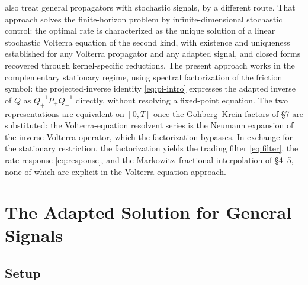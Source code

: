 \documentclass[11pt]{article}
\theoremstyle{plain}
\begin{document}
\citet{AbiJaberNeuman2025} also treat general propagators with stochastic signals, by a different route. That approach solves the finite-horizon problem by infinite-dimensional stochastic control: the optimal rate is characterized as the unique solution of a linear stochastic Volterra equation of the second kind, with existence and uniqueness established for any Volterra propagator and any adapted signal, and closed forms recovered through kernel-specific reductions. The present approach works in the complementary stationary regime, using spectral factorization of the friction symbol: the projected-inverse identity \eqref{eq:pi-intro} expresses the adapted inverse of $Q$ as $Q_+^{-1}P_+Q_-^{-1}$ directly, without resolving a fixed-point equation. The two representations are equivalent on $[0,T]$ once the Gohberg--Krein factors of \S7 are substituted: the Volterra-equation resolvent series is the Neumann expansion of the inverse Volterra operator, which the factorization bypasses. In exchange for the stationary restriction, the factorization yields the trading filter \eqref{eq:filter}, the rate response \eqref{eq:response}, and the Markowitz--fractional interpolation of \S4--5, none of which are explicit in the Volterra-equation approach.

\section{The Adapted Solution for General Signals}

\subsection{Setup}
\end{document}
